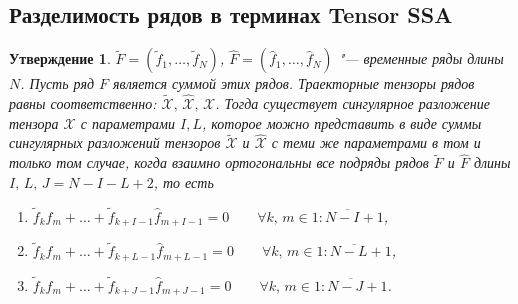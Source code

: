 \documentclass[specialist,
    substylefile = spbu_report.rtx,
    subf,href,colorlinks=true, 12pt]{disser}
\theoremstyle{plain}
\newtheorem{statement}{Утверждение}[section]
\theoremstyle{definition}
\theoremstyle{remark}
\begin{document}
    \subsection{Разделимость рядов в терминах Tensor SSA}\label{subsec:tensor-ssa-separability}
    \begin{statement}
        \label{state:separability}
        $\tilde{F}=(\tilde{f}_1,\ldots , \tilde{f}_N)$, $\hat{F}=(\hat{f}_1,\ldots , \hat{f}_N)$ "--- временные ряды длины $N$.
        Пусть ряд $F$ является суммой этих рядов.
        Траекторные тензоры рядов равны соответственно: $\tilde{\mathcal{X}},\, \hat{\mathcal{X}},\, \mathcal{X}$.
        Тогда существует сингулярное разложение тензора $\mathcal{X}$ с параметрами $I, L$, которое можно представить
        в виде суммы сингулярных разложений тензоров $\tilde{\mathcal{X}}$ и $\hat{\mathcal{X}}$ с теми же параметрами
        в том и только том случае, когда взаимно ортогональны все подряды рядов $\tilde{F}$ и $\hat{F}$
        длины $I,\, L,\, J=N-I-L+2$, то есть
        \begin{enumerate}
            \item $\tilde{f}_{k}\hat{f}_m + \ldots + \tilde{f}_{k+I-1} \hat{f}_{m+I-1}=0 \qquad \forall k,\, m\in\overline{1:N-I+1}$,
            \item $\tilde{f}_{k}\hat{f}_m + \ldots + \tilde{f}_{k+L-1} \hat{f}_{m+L-1}=0 \qquad \forall k,\, m\in\overline{1:N-L+1}$,
            \item $\tilde{f}_{k}\hat{f}_m + \ldots + \tilde{f}_{k+J-1} \hat{f}_{m+J-1}=0 \qquad \forall k,\, m\in\overline{1:N-J+1}$.
        \end{enumerate}
    \end{statement}
\end{document}
